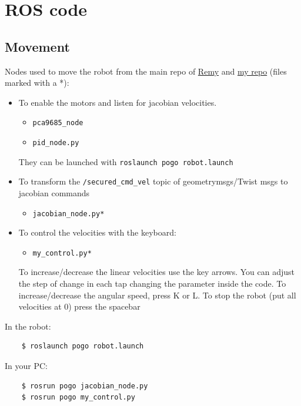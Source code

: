 \documentclass{article}
\begin{document}
\section{ROS code}
\subsection{Movement}
Nodes used to move the robot from the main repo of \href{https://gitlab.u-angers.fr/remyguyonneau/pogo}{Remy} and \href{https://github.com/ivrolan/my_pogo}{my repo} (files marked with a *):

\begin{itemize}
    
    \item To enable the motors and listen for jacobian velocities.
    \begin{itemize}
        \item \verb|pca9685_node|
        \item \verb|pid_node.py|
    \end{itemize}
    
    They can be launched with \verb|roslaunch pogo robot.launch|
    
    \item To transform the \verb|/secured_cmd_vel| topic of geometry\textunderscore msgs/Twist msgs to jacobian commands
    \begin{itemize}
        \item \verb|jacobian_node.py*|
    \end{itemize}
    
    \item To control the velocities with the keyboard:
    \begin{itemize}
        \item \verb|my_control.py*|
    \end{itemize}
    To increase/decrease the linear velocities use the key arrows. You can adjust the step of change in each tap changing the parameter inside the code. To increase/decrease the angular speed, press K or L. To stop the robot (put all velocities at 0) press the spacebar
    
\end{itemize}

In the robot:
\begin{verbatim}
    $ roslaunch pogo robot.launch
\end{verbatim}

In your PC:
\begin{verbatim}
    $ rosrun pogo jacobian_node.py
    $ rosrun pogo my_control.py
\end{verbatim}
\end{document}
